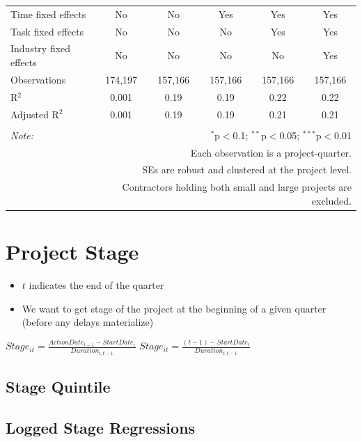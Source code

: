 \documentclass[
]{article}
\providecommand{\tightlist}{%
  \setlength{\itemsep}{0pt}\setlength{\parskip}{0pt}}
\begin{document}
\begin{table}[H]
\begin{tabular}{@{\extracolsep{-10pt}}lccccc}
Time fixed effects & No & No & Yes & Yes & Yes \\ 
Task fixed effects & No & No & No & Yes & Yes \\ 
Industry fixed effects & No & No & No & No & Yes \\ 
Observations & 174,197 & 157,166 & 157,166 & 157,166 & 157,166 \\ 
R$^{2}$ & 0.001 & 0.19 & 0.19 & 0.22 & 0.22 \\ 
Adjusted R$^{2}$ & 0.001 & 0.19 & 0.19 & 0.21 & 0.21 \\ 
\hline 
\hline \\[-1.8ex] 
\textit{Note:}  & \multicolumn{5}{r}{$^{*}$p$<$0.1; $^{**}$p$<$0.05; $^{***}$p$<$0.01} \\ 
 & \multicolumn{5}{r}{Each observation is a project-quarter.} \\ 
 & \multicolumn{5}{r}{SEs are robust and clustered at the project level.} \\ 
 & \multicolumn{5}{r}{Contractors holding both small and large projects are excluded.} \\ 
\end{tabular} 
\end{table}

\hypertarget{project-stage}{%
\section{Project Stage}\label{project-stage}}

\begin{itemize}
\tightlist
\item
  \(t\) indicates the end of the quarter
\item
  We want to get stage of the project at the beginning of a given
  quarter (before any delays materialize)
\end{itemize}

\(Stage_{it}=\frac{ActionDate_{t-1}-StartDate_i}{Duration_{i,t-1}}\)
\(Stage_{it}=\frac{(t-1)-StartDate_i}{Duration_{i,t-1}}\)

\hypertarget{stage-quintile}{%
\subsection{Stage Quintile}\label{stage-quintile}}

\hypertarget{logged-stage-regressions}{%
\subsection{Logged Stage Regressions}\label{logged-stage-regressions}}
\end{document}
